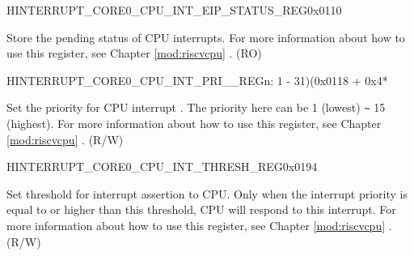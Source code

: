 \begin{register}{H}{INTERRUPT\_CORE0\_CPU\_INT\_EIP\_STATUS\_REG}{0x0110}\label{regdesc:INTERRUPTCORE0CPUINTEIPSTATUSREG}
%
\regnewline%
\begin{regdesc}\begin{reglist}
\label{fielddesc:INTERRUPTCORE0CPUINTEIPSTATUS}\item [INTERRUPT\_CORE0\_CPU\_INT\_EIP\_STATUS] Store the pending status of CPU interrupts. For more information about how to use this register, see Chapter \ref{mod:riscvcpu} \textit{}. (RO)
\end{reglist}\end{regdesc}
\end{register}


\begin{register}{H}{INTERRUPT\_CORE0\_CPU\_INT\_PRI\_\_REG}{n: 1 - 31)(0x0118 + 0x4*}\label{regdesc:INTERRUPTCORE0CPUINTPRI0REG}
%
%
\regnewline%
\begin{regdesc}\begin{reglist}
\label{fielddesc:INTERRUPTCORE0CPUPRI0MAP}\item [INTERRUPT\_CORE0\_CPU\_PRI\_\regindex{n}\_MAP] Set the priority for CPU interrupt . The priority here can be 1 (lowest) \verb+~+ 15 (highest). For more information about how to use this register, see Chapter \ref{mod:riscvcpu} \textit{}. (R/W)
\end{reglist}\end{regdesc}
\end{register}

\begin{register}{H}{INTERRUPT\_CORE0\_CPU\_INT\_THRESH\_REG}{0x0194}\label{regdesc:INTERRUPTCORE0CPUINTTHRESHREG}
%
%
\regnewline%
\begin{regdesc}\begin{reglist}
\label{fielddesc:INTERRUPTCORE0CPUINTTHRESH}\item [INTERRUPT\_CORE0\_CPU\_INT\_THRESH] Set threshold for interrupt assertion to CPU. Only when the interrupt priority is equal to or higher than this threshold, CPU will respond to this interrupt. For more information about how to use this register, see Chapter \ref{mod:riscvcpu} \textit{}. (R/W)
\end{reglist}\end{regdesc}
\end{register}


